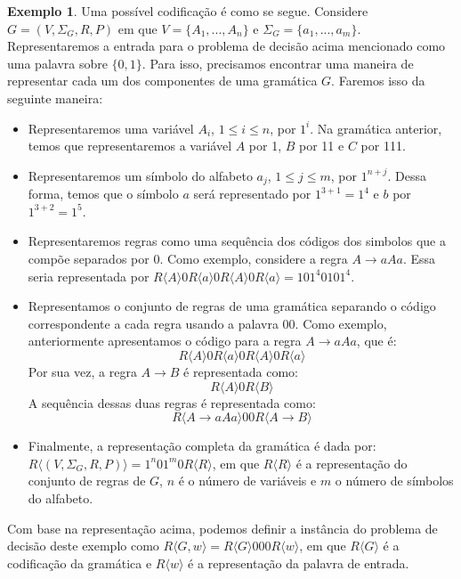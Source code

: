 \documentclass[a4paper]{article}
\theoremstyle{definition}
\newtheorem{Example}{Exemplo}
\begin{document}
\begin{Example}
    Uma possível codificação é como se segue. Considere $G = (V,\Sigma_G,R,P)$
    em que $V = \{A_1,...,A_n\}$ e $\Sigma_G =\{a_1,...,a_m\}$. Representaremos
    a entrada para o problema de decisão acima mencionado como uma palavra
    sobre $\{0,1\}$. Para isso, precisamos encontrar uma maneira de representar
    cada um dos componentes de uma gramática $G$. Faremos isso da seguinte maneira:
    \begin{itemize}
       \item Representaremos uma variável $A_i$, $1 \leq i \leq n$, por $1^i$.
         Na gramática anterior, temos que representaremos a variável $A$ por 1,
         $B$ por 11 e $C$ por 111.
       \item Representaremos um símbolo do alfabeto $a_j$, $1 \leq j \leq m$,
         por $1^{n + j}$. Dessa forma, temos que o símbolo $a$ será representado
         por $1^{3+1} = 1^4$ e $b$ por $1^{3 + 2} = 1^5$.
       \item Representaremos regras como uma sequência dos códigos dos simbolos
         que a compõe separados por 0. Como exemplo, considere a regra $A \to
         aAa$. Essa seria representada por
         $R\langle A \rangle 0 R\langle a \rangle 0 R\langle A \rangle 0
         R\langle a \rangle = 1 0 1^4 0 1 0 1^4$.
       \item Representamos o conjunto de regras de uma gramática separando o
         código correspondente a cada regra usando a palavra 00. Como exemplo,
         anteriormente apresentamos o código para a regra $A \to aAa$, que é:
         \[
           R\langle A \rangle 0 R\langle a \rangle 0 R\langle A \rangle 0
            R\langle a \rangle
         \]
         Por sua vez, a regra $A \to B$ é representada como:
         \[
           R\langle A \rangle 0 R\langle B \rangle
         \]
         A sequência dessas duas regras é representada como:
         \[
           R\langle A \to aAa \rangle 00 R\langle A \to B \rangle
         \]
       \item Finalmente, a representação completa da gramática é dada por:
         $R\langle (V,\Sigma_G,R,P)\rangle = 1^n01^m0 R\langle R \rangle$, em
         que $R\langle R \rangle$ é a representação do conjunto de regras de
         $G$, $n$ é o número de variáveis e $m$ o número de símbolos do alfabeto.
     \end{itemize}
     Com base na representação acima, podemos definir a instância do problema de
     decisão deste exemplo como $R\langle G, w \rangle = R\langle G \rangle 000
     R\langle  w \rangle$, em que $R\langle G \rangle$ é a codificação da
     gramática e $R\langle w \rangle$ é a representação da palavra de entrada.  
  \end{Example}
\end{document}
